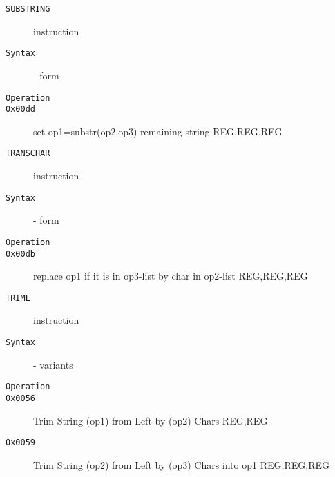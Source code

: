 \clearpage
\begin{description}
\item[\texttt{SUBSTRING}] instruction\\
\item[\texttt{Syntax}] - form \\

\item[\texttt{Operation}]
\item[\texttt{}]
\item[\texttt{0x00dd}] set op1=substr(op2,op3) remaining string  {REG,REG,REG}       \\
\end{description}
\clearpage
\begin{description}
\item[\texttt{TRANSCHAR}] instruction\\
\item[\texttt{Syntax}] - form \\

\item[\texttt{Operation}]
\item[\texttt{}]
\item[\texttt{0x00db}] replace op1 if it is in op3-list by char in op2-list  {REG,REG,REG}       \\
\end{description}
\clearpage
\begin{description}
\item[\texttt{TRIML}] instruction\\
\item[\texttt{Syntax}] - variants\\

\item[\texttt{Operation}]
\item[\texttt{}]
\item[\texttt{0x0056}] Trim String (op1) from Left by (op2) Chars  {REG,REG}           \\
\item[\texttt{0x0059}] Trim String (op2) from Left by (op3) Chars into op1  {REG,REG,REG}       \\
\end{description}

